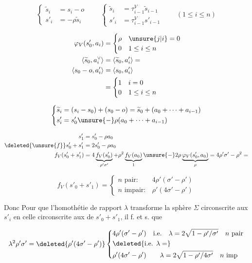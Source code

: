 \[
\left\{\begin{aligned}\widetilde{s}_i&=s_i-o\\s'_i&=-\rho\widetilde{s}_i\end{aligned}\right.
\qquad\left\{\begin{aligned}
\widetilde{s}_i&=\tau_{i-1}^V\widetilde{s}_{i-1}\\
s'_i&=\tau_{i-1}^V s'_{i-1}
\end{aligned}\right.\qquad(1\le i\le n)
\]

\[
\begin{aligned}
\varphi_V(s'_0,a_i)&=\begin{cases}\rho&\unsure{j|i}=0\\0&1\le i\le n\end{cases}\\
\langle\widetilde{s}_0,a_i^\vee\rangle&=\langle\widetilde{s}_0,a'_i\rangle=\\
\langle s_0-o,a'_i\rangle&=\langle s_0,a'_i\rangle\\
&=\begin{cases}1&i=0\\0&1\le i\le n\end{cases}
\end{aligned}
\]

\[
\left\{\begin{aligned}
\widetilde{s}_i&=(s_i-s_0)+(s_0-o)=\widetilde{s}_0+(a_0+\cdots+a_{i-1})\\
s'_i&=s'_0\unsure{-}\rho(a_0+\cdots+a_{i-1})
\end{aligned}\right.
\]

\[
\begin{aligned}
s'_1&=s'_0-\rho a_0\\
\deleted{\unsure{f}}s'_0+s'_1&=2s'_0-\rho a_0\\
f_V(s'_0+s'_1)&=4\underbrace{f_V(s'_0)}_{\rho'\sigma'}+\rho^2
\underbrace{f_V(a_0)}_1\unsure{-}2\rho\underbrace{\varphi_V(s'_0,a_0)}_\rho
=4\rho'\sigma'-\rho^2=
\end{aligned}
\]

\[
f_V(s'_0+s'_1)=\begin{cases}
n\text{ pair}:&4\rho'(\sigma'-\rho')\\
n\text{ impair}:&\rho'(4\sigma'-\rho')
\end{cases}
\]

Donc Pour que l'homothétie de rapport $\lambda$ transforme la sphère $\Sigma$ circonscrite aux $s'_i$ en celle circonscrite aux  de $s'_0+s'_1$, il f. et s. que

\[
\lambda^2\rho'\sigma'=\deleted{\rho'(4\sigma'-\rho')}
\left\{\begin{aligned}
&4\rho'(\sigma'-\rho')\quad\text{i.e.}\quad
\lambda=2\sqrt{1-\rho'/\sigma'}\quad n\text{ pair}\\
&\deleted{\text{i.e. }\lambda=}\\
&\rho'(4\sigma'-\rho')\qquad\lambda=2\sqrt{1-\rho'/4\sigma'}\quad n\text{ imp}
\end{aligned}\right.
\]
